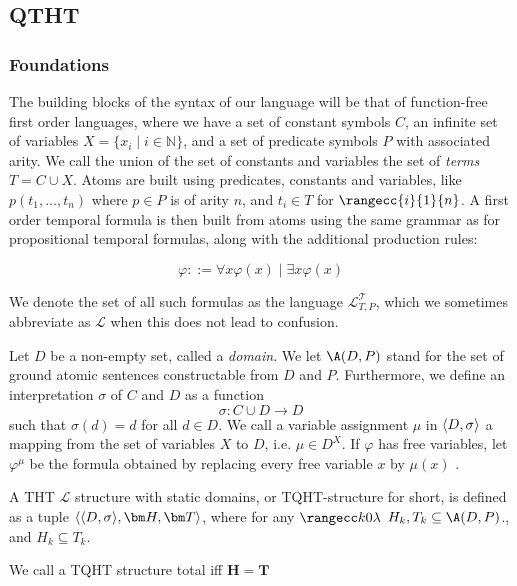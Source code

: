 \subsection{QTHT}



\subsubsection{Foundations}

The building blocks of the syntax of our language will be that of
function-free first order languages, where we have a set of constant
symbols $C$, an infinite set of variables
$X=\{x_i \mid i\in \mathbb{N} \}$, and a set of predicate symbols $P$
with associated arity. We call the union of the set of constants and
variables the set of \emph{terms} $T = C \cup X$. Atoms are built
using predicates, constants and variables, like $p(t_1,\dots, t_n)$
where $p\in P$ is of arity $n$, and $t_i \in T$ for
$\rangecc{i}{1}{n}$. A first order temporal formula is then built from
atoms using the same grammar as for propositional temporal formulas,
along with the additional production rules:

$$
\varphi ::= \forall x \varphi(x) \mid \exists x \varphi(x)
$$

We denote the set of all such formulas as the language
$\mathcal{L}_{T,P}^{\mathcal{T}}$, which we sometimes abbreviate as $\mathcal{L}$
when this does not lead to confusion.

Let $D$ be a non-empty set, called a \emph{domain}. We let $\A(D,P)$
stand for the set of ground atomic sentences constructable from $D$
and $P$. Furthermore, we define an interpretation $\sigma$ of $C$ and
$D$ as a function
$$
\sigma: C \cup D \rightarrow D
$$
such that $\sigma(d) = d$ for all $d \in D$. We call a variable
assignment $\mu$ in $\langle D, \sigma \rangle$ a mapping from the set of variables $X$ to
$D$, i.e. $\mu \in D^X$. If $\varphi$ has free variables, let $\varphi^\mu$ be the formula
obtained by replacing every free variable $x$ by $\mu(x)$
\cite{agcapevidi17a}.

\begin{definition}
  A THT $\mathcal{L}$ structure with static domains, or TQHT-structure
  for short, is defined as a tuple $\qthandt$, where for any
  $\kinlambda$ $H_k,T_k \subseteq \A(D,P)$., and $H_k \subseteq T_k$.

  We call a TQHT structure total iff $\bm{H}=\bm{T}$
\end{definition}



